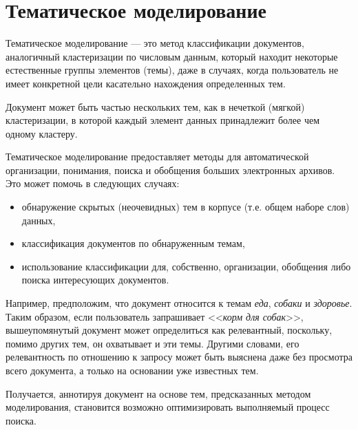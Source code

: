 \section{Тематическое моделирование}

Тематическое моделирование --- это метод классификации документов, аналогичный кластеризации по числовым данным, который находит некоторые естественные группы элементов (темы), даже в случаях, когда пользователь не имеет конкретной цели касательно нахождения определенных тем.

Документ может быть частью нескольких тем, как в нечеткой (мягкой) кластеризации, в которой каждый элемент данных принадлежит более чем одному кластеру.

Тематическое моделирование предоставляет методы для автоматической организации, понимания, поиска и обобщения больших электронных архивов. Это может помочь в следующих случаях:

\begin{itemize}
\item обнаружение скрытых (неочевидных) тем в корпусе (т.е. общем наборе слов) данных,
\item классификация документов по обнаруженным темам,
\item использование классификации для, собственно, организации, обобщения либо поиска интересующих документов.
\end{itemize}

Например, предположим, что документ относится к темам \textit{еда}, \textit{собаки} и \textit{здоровье}. Таким образом, если пользователь запрашивает <<\textit{корм для собак}>>, вышеупомянутый документ может определиться как релевантный, поскольку, помимо других тем, он охватывает и эти темы. Другими словами, его релевантность по отношению к запросу может быть выяснена даже без просмотра всего документа, а только на основании уже известных тем.

Получается, аннотируя документ на основе тем, предсказанных методом моделирования, становится возможно оптимизировать выполняемый процесс поиска.